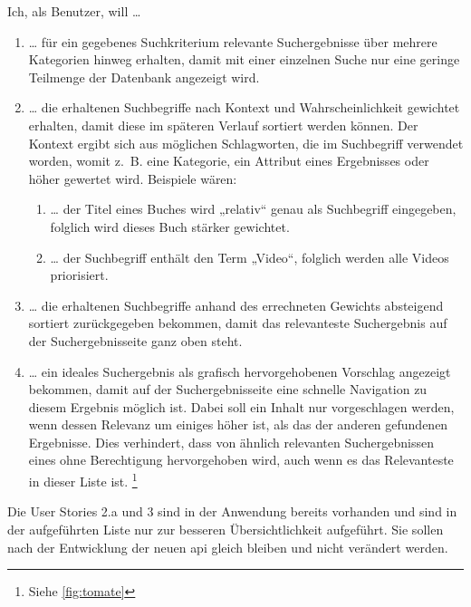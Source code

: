 \pagebreak
Ich, als Benutzer, will …
\begin{enumerate}
  \item … für ein gegebenes Suchkriterium relevante Suchergebnisse über mehrere Kategorien hinweg erhalten, damit mit einer einzelnen Suche nur eine geringe Teilmenge der Datenbank angezeigt wird.
  \item … die erhaltenen Suchbegriffe nach Kontext und Wahrscheinlichkeit gewichtet erhalten, damit diese im späteren Verlauf sortiert werden können. Der Kontext ergibt sich aus möglichen Schlagworten, die im Suchbegriff verwendet worden, womit z. B. eine Kategorie, ein Attribut eines Ergebnisses oder höher gewertet wird. Beispiele wären:
    \begin{enumerate}
      \item … der Titel eines Buches wird „relativ“ genau als Suchbegriff eingegeben, folglich wird dieses Buch stärker gewichtet.
      \item … der Suchbegriff enthält den Term „Video“, folglich werden alle Videos priorisiert.
    \end{enumerate}
  \item … die erhaltenen Suchbegriffe anhand des errechneten Gewichts absteigend sortiert zurückgegeben bekommen, damit das relevanteste Suchergebnis auf der Suchergebnisseite ganz oben steht.
  \item … ein ideales Suchergebnis als grafisch hervorgehobenen Vorschlag angezeigt bekommen, damit auf der Suchergebnisseite eine schnelle Navigation zu diesem Ergebnis möglich ist.
    Dabei soll ein Inhalt nur vorgeschlagen werden, wenn dessen Relevanz um einiges höher ist, als das der anderen gefundenen Ergebnisse.
    Dies verhindert, dass von ähnlich relevanten Suchergebnissen eines ohne Berechtigung hervorgehoben wird, auch wenn es das Relevanteste in dieser Liste ist. \footnote{Siehe \ref{fig:tomate}}
\end{enumerate}

Die User Stories 2.a und 3 sind in der Anwendung bereits vorhanden und sind in der aufgeführten Liste nur zur besseren Übersichtlichkeit aufgeführt. Sie sollen nach der Entwicklung der neuen \gls{api} gleich bleiben und nicht verändert werden.
